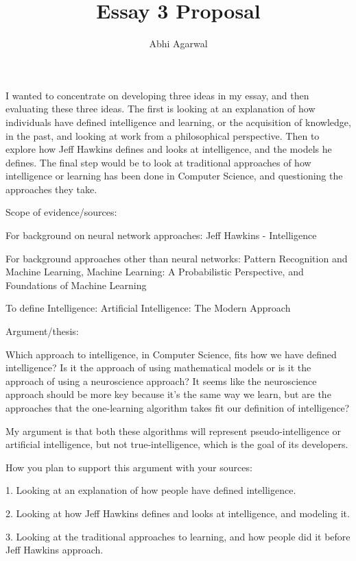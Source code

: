 \documentclass[11pt, oneside]{article}
\title{Essay 3 Proposal}
\author{Abhi Agarwal}
\date{}
\begin{document}
\maketitle


\par I wanted to concentrate on developing three ideas in my essay, and then evaluating these three ideas. The first is looking at an explanation of how individuals have defined intelligence and learning, or the acquisition of knowledge, in the past, and looking at work from a philosophical perspective. Then to explore how Jeff Hawkins defines and looks at intelligence, and the models he defines. The final step would be to look at traditional approaches of how intelligence or learning has been done in Computer Science, and questioning the approaches they take.

\par Scope of evidence/sources: 
\par For background on neural network approaches: Jeff Hawkins - Intelligence
\par For background approaches other than neural networks: Pattern Recognition and Machine Learning, Machine Learning: A Probabilistic Perspective, and Foundations of Machine Learning
\par To define Intelligence: Artificial Intelligence: The Modern Approach

\par Argument/thesis:
\par Which approach to intelligence, in Computer Science, fits how we have defined intelligence? Is it the approach of using mathematical models or is it the approach of using a neuroscience approach? It seems like the neuroscience approach should be more key because it's the same way we learn, but are the approaches that the one-learning algorithm takes fit our definition of intelligence?  
\par My argument is that both these algorithms will represent pseudo-intelligence or artificial intelligence, but not true-intelligence, which is the goal of its developers. 

\par How you plan to support this argument with your sources:

\par 1. Looking at an explanation of how people have defined intelligence.
\par 2. Looking at how Jeff Hawkins defines and looks at intelligence, and modeling it.
\par 3. Looking at the traditional approaches to learning, and how people did it before Jeff Hawkins approach.

\par
\end{document}
